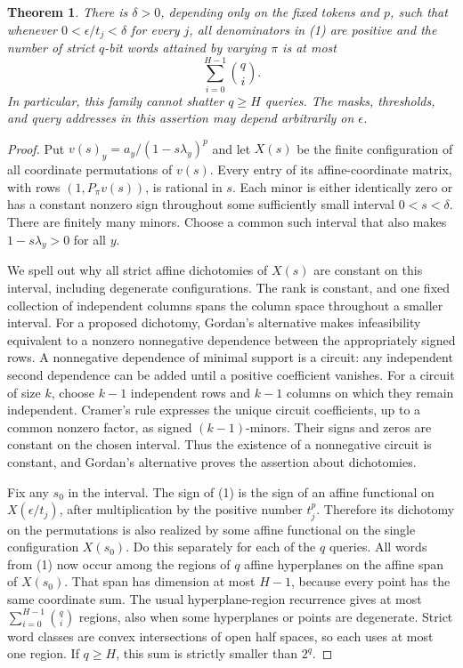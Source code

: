 \documentclass[11pt]{article}
\newtheorem{theorem}{Theorem}
\begin{document}
\begin{theorem}
There is $\delta>0$, depending only on the fixed tokens and $p$, such
that whenever $0<\epsilon/t_j<\delta$ for every $j$, all denominators
in (1) are positive and the number of strict $q$-bit words attained by
varying $\pi$ is at most
\[
 \sum_{i=0}^{H-1}\binom qi.                     \tag{2}
\]
In particular, this family cannot shatter $q\geq H$ queries. The masks,
thresholds, and query addresses in this assertion may depend arbitrarily
on $\epsilon$.
\end{theorem}
\begin{proof}
Put $v(s)_y=a_y/(1-s\lambda_y)^p$ and let $X(s)$ be the finite
configuration of all coordinate permutations of $v(s)$. Every entry of
its affine-coordinate matrix, with rows $(1,P_\pi v(s))$, is rational
in $s$. Each minor is either identically zero or has a constant nonzero
sign throughout some sufficiently small interval $0<s<\delta$.
There are finitely many minors. Choose a common such interval that
also makes $1-s\lambda_y>0$ for all $y$.

We spell out why all strict affine dichotomies of $X(s)$ are constant
on this interval, including degenerate configurations. The rank is
constant, and one fixed collection of independent columns spans the
column space throughout a smaller interval. For a proposed dichotomy,
Gordan's alternative makes infeasibility equivalent to a nonzero
nonnegative dependence between the appropriately signed rows. A
nonnegative dependence of minimal support is a circuit: any independent
second dependence can be added until a positive coefficient vanishes.
For a circuit of size $k$, choose $k-1$ independent rows and $k-1$
columns on which they remain independent. Cramer's rule expresses the
unique circuit coefficients, up to a common nonzero factor, as signed
$(k-1)$-minors. Their signs and zeros are constant on the chosen
interval. Thus the existence of a nonnegative circuit is constant,
and Gordan's alternative proves the assertion about dichotomies.

Fix any $s_0$ in the interval. The sign of (1) is the sign of an affine
functional on $X(\epsilon/t_j)$, after multiplication by the positive
number $t_j^p$. Therefore its dichotomy on the permutations is also
realized by some affine functional on the single configuration
$X(s_0)$. Do this separately for each of the $q$ queries. All words
from (1) now occur among the regions of $q$ affine hyperplanes on the
affine span of $X(s_0)$. That span has dimension at most $H-1$, because
every point has the same coordinate sum. The usual hyperplane-region
recurrence gives at most $\sum_{i=0}^{H-1}\binom qi$ regions, also
when some hyperplanes or points are degenerate. Strict word classes
are convex intersections of open half spaces, so each uses at most
one region. If $q\geq H$, this sum is strictly smaller than $2^q$.
\end{proof}
\end{document}
